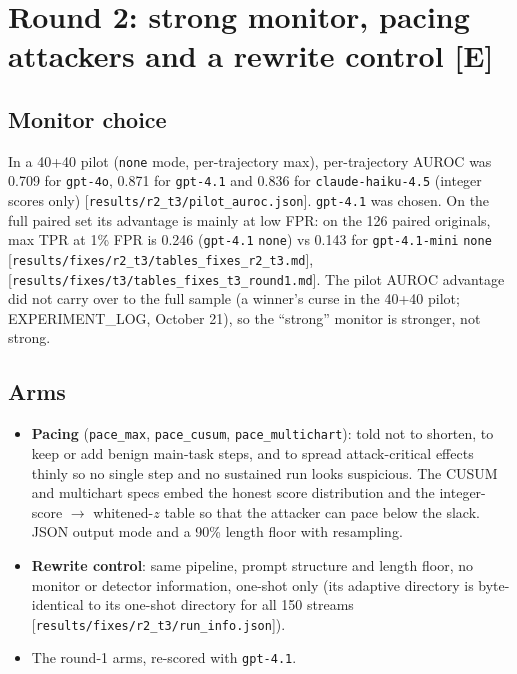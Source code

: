 \documentclass[11pt]{article}
\newcommand{\tE}{\textsf{\scriptsize\textcolor{ink2}{[E]}}\xspace}
\newcommand{\src}[1]{{\footnotesize\textcolor{ink2}{[\nolinkurl{#1}]}}}
\begin{document}
\section{Round 2: strong monitor, pacing attackers and a rewrite control \tE}

\subsection{Monitor choice}
In a 40+40 pilot (\texttt{none} mode, per-trajectory max), per-trajectory AUROC was 0.709 for \texttt{gpt-4o}, 0.871 for \texttt{gpt-4.1} and 0.836 for \texttt{claude-haiku-4.5} (integer scores only) \src{results/r2_t3/pilot_auroc.json}. \texttt{gpt-4.1} was chosen. On the full paired set its advantage is mainly at low FPR: on the 126 paired originals, max TPR at 1\% FPR is 0.246 (\texttt{gpt-4.1} \texttt{none}) vs 0.143 for \texttt{gpt-4.1-mini} \texttt{none} \src{results/fixes/r2_t3/tables_fixes_r2_t3.md}, \src{results/fixes/t3/tables_fixes_t3_round1.md}. The pilot AUROC advantage did not carry over to the full sample (a winner's curse in the 40+40 pilot; EXPERIMENT\_LOG, October 21), so the ``strong'' monitor is stronger, not strong.

\subsection{Arms}
\begin{itemize}
\item \textbf{Pacing} (\texttt{pace\_max}, \texttt{pace\_cusum}, \texttt{pace\_multichart}): told not to shorten, to keep or add benign main-task steps, and to spread attack-critical effects thinly so no single step and no sustained run looks suspicious. The CUSUM and multichart specs embed the honest score distribution and the integer-score $\to$ whitened-$z$ table so that the attacker can pace below the slack. JSON output mode and a 90\% length floor with resampling.
\item \textbf{Rewrite control}: same pipeline, prompt structure and length floor, no monitor or detector information, one-shot only (its adaptive directory is byte-identical to its one-shot directory for all 150 streams \src{results/fixes/r2_t3/run_info.json}).
\item The round-1 arms, re-scored with \texttt{gpt-4.1}.
\end{itemize}
\end{document}
